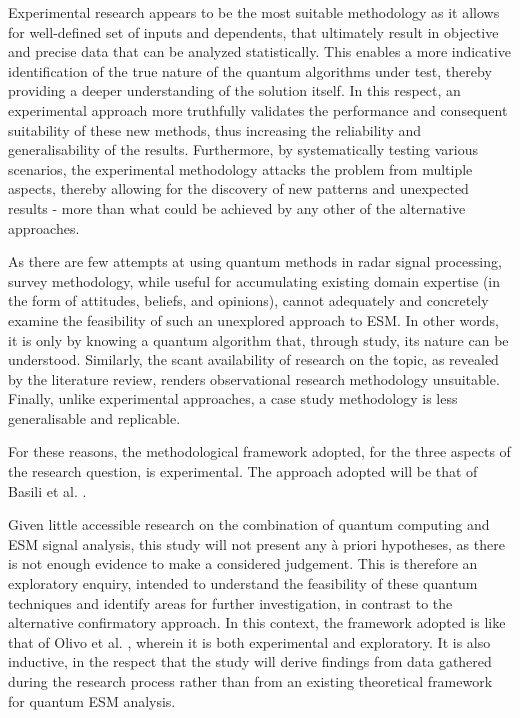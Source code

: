 Experimental research appears to be the most suitable methodology as it allows for well-defined set of inputs and dependents, that ultimately result in objective and precise data that can be analyzed statistically.
This enables a more indicative identification of the true nature of the quantum algorithms under test, thereby providing a deeper understanding of the solution itself.
In this respect, an experimental approach more truthfully validates the performance and consequent suitability of these new methods, thus increasing the reliability and generalisability of the results.
Furthermore, by systematically testing various scenarios, the experimental methodology attacks the problem from multiple aspects, thereby allowing for the discovery of new patterns and unexpected results - more than what could be achieved by any other of the alternative approaches. 

As there are few attempts at using quantum methods in radar signal processing, survey methodology, while useful for accumulating existing domain expertise (in the form of attitudes, beliefs, and opinions), cannot adequately and concretely examine the feasibility of such an unexplored approach to \ac{ESM}.
In other words, it is only by knowing a quantum algorithm that, through study, its nature can be understood.
Similarly, the scant availability of research on the topic, as revealed by the literature review, renders observational research methodology unsuitable.
Finally, unlike experimental approaches, a case study methodology is less generalisable and replicable.

For these reasons, the methodological framework adopted, for the three aspects of the research question, is experimental. 
The approach adopted will be that of Basili et al. \cite{basili_experimentation_1985}.

Given little accessible research on the combination of quantum computing and \ac{ESM} signal analysis, this study will not present any \`{a} priori hypotheses, as there is not enough evidence to make a considered judgement.
This is therefore an exploratory enquiry, intended to understand the feasibility of these quantum techniques and identify areas for further investigation, in contrast to the alternative confirmatory approach.
In this context, the framework adopted is like that of Olivo et al. \cite{oivo_software_2004}, wherein it is both experimental and exploratory.
It is also inductive, in the respect that the study will derive findings from data gathered during the research process rather than from an existing theoretical framework for quantum \ac{ESM} analysis.

